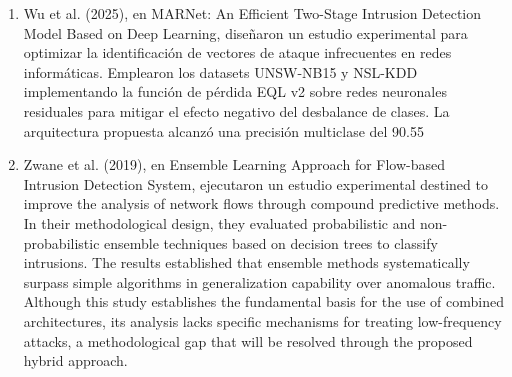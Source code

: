\begin{enumerate}
\item Wu et al. (2025), en MARNet: An Efficient Two-Stage Intrusion Detection Model Based on Deep Learning, diseñaron un estudio experimental para optimizar la identificación de vectores de ataque infrecuentes en redes informáticas. Emplearon los datasets UNSW-NB15 y NSL-KDD implementando la función de pérdida EQL v2 sobre redes neuronales residuales para mitigar el efecto negativo del desbalance de clases. La arquitectura propuesta alcanzó una precisión multiclase del 90.55%

\item Zwane et al. (2019), en Ensemble Learning Approach for Flow-based Intrusion Detection System, ejecutaron un estudio experimental destined to improve the analysis of network flows through compound predictive methods. In their methodological design, they evaluated probabilistic and non-probabilistic ensemble techniques based on decision trees to classify intrusions. The results established that ensemble methods systematically surpass simple algorithms in generalization capability over anomalous traffic. Although this study establishes the fundamental basis for the use of combined architectures, its analysis lacks specific mechanisms for treating low-frequency attacks, a methodological gap that will be resolved through the proposed hybrid approach.

\end{enumerate}

